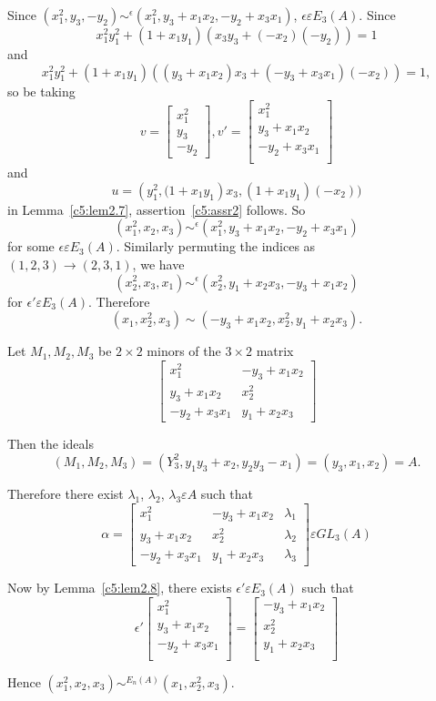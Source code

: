 \begin{assr}\label{c5:assr2}
Since
$\left(x^{2}_1,y_3,-y_2\right)\displaystyle\mathop{\sim}^{\epsilon}\left(x^{2}_1,y_3+x_1x_2,-y_2+x_3x_1\right)$,
$\epsilon \varepsilon E_3(A)$. Since 
$$
x^{2}_1y^{2}_1+(1+x_1y_1)(x_3y_3+(-x_2)(-y_2))=1
$$
and
$$
x^{2}_1y^{2}_1+(1+x_1y_1)((y_3+x_1x_2)x_3+(-y_3+x_3x_1)(-x_2))=1, 
$$
so be taking 
$$
v=
\begin{bmatrix}
x^{2}_1\\
y_3\\
-y_2
\end{bmatrix}, v'=
\begin{bmatrix}
x^{2}_1\\
y_3+x_1x_2\\
-y_2+x_3x_1\\
\end{bmatrix}
$$
and
$$
u=\left(y^{2}_1,(1+x_1y_1\right)x_3,(1+x_1y_1)(-x_2))
$$
in Lemma~\ref{c5:lem2.7}, assertion~\ref{c5:assr2} follows. So 
$$
\left(x^{2}_1,x_2,x_3\right)\displaystyle\mathop{\sim}^{\epsilon}\left(x^{2}_1,y_3+x_1x_2,-y_2+x_3x_1\right)
$$
for some $\epsilon \varepsilon E_3(A)$. Similarly permuting the
indices as\\ $(1,2,3)\rightarrow (2,3,1)$, we have 
$$
\left(x^{2}_2,x_3,x_1\right)\displaystyle\mathop{\sim}^{\epsilon}\left(x^{2}_2,y_1+x_2x_3,-y_3+x_1x_2\right)
$$
for $\epsilon'\varepsilon E_3(A)$. Therefore 
$$
\left(x_1,x^{2}_2,x_3\right)\sim
\left(-y_3+x_1x_2,x^{2}_2,y_1+x_2x_3\right).
$$

Let $M_1, M_2,M_3$ be $2\times 2$ minors of the $3\times 2$ matrix
$$
\begin{bmatrix}
x^{2}_1 & -y_3+x_1x_2\\
y_3+x_1x_2 & x^{2}_2\\
-y_2+x_3x_1 & y_1+x_2x_3
\end{bmatrix}
$$

Then the ideals
$$
(M_1,M_2,M_3)=\left(Y^{2}_3,y_1y_3+x_2,y_2y_3-x_1\right)=\left(y_3,x_1,x_2\right)=A.
$$

Therefore there exist $\lambda_1$, $\lambda_2$, $\lambda_3\varepsilon
A$ such that 
$$
\alpha=
\begin{bmatrix}
x^{2}_1 & -y_3+x_1x_2 & \lambda_1\\
y_3+x_1x_2 & x^{2}_2 & \lambda_2\\
-y_2+x_3x_1 & y_1+x_2x_3 & \lambda_3
\end{bmatrix} \varepsilon GL_3(A)
$$

Now by Lemma~\ref{c5:lem2.8}, there exists $\epsilon' \varepsilon
E_3(A)$ such that 
$$
\epsilon'
\begin{bmatrix}
x^{2}_1\\
y_3+x_1x_2\\-y_2+x_3x_1\\
\end{bmatrix}=\begin{bmatrix}
-y_3+x_1x_2\\
x^{2}_2\\
y_1+x_2x_3\\
\end{bmatrix}
$$

Hence $\left(x^{2}_1,x_2,x_3\right)\displaystyle\mathop{\sim}^{E_n(A)}\left(x_1,x^{2}_2,x_3\right)$.
\end{assr}


